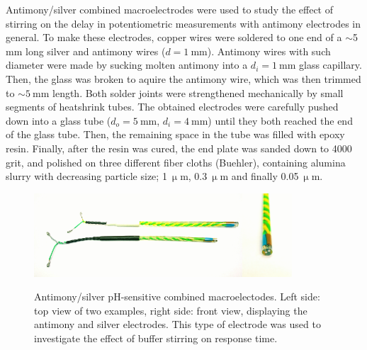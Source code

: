 Antimony/silver combined macroelectrodes were used to study the effect of stirring on the delay in potentiometric measurements with antimony electrodes in general.
To make these electrodes, copper wires were soldered to one end of a $\sim$5$~$mm long silver and antimony wires ($d = 1~$mm).
Antimony wires with such diameter were made by sucking molten antimony into a $d_i = 1~$mm glass capillary.
Then, the glass was broken to aquire the antimony wire, which was then trimmed to $\sim 5~$mm length.
Both solder joints were strengthened mechanically by small segments of heatshrink tubes.
The obtained electrodes were carefully pushed down into a glass tube ($d_o = 5~$mm, $d_i=4~$mm) until they both reached the end of the glass tube.
Then, the remaining space in the tube was filled with epoxy resin.
Finally, after the resin was cured, the end plate was sanded down to 4000 grit, and polished on three different fiber cloths (Buehler), containing alumina slurry with decreasing particle size; 1$~\upmu$m, 0.3$~\upmu$m and finally 0.05$~\upmu$m.

\begin{figure}
\centering
\includegraphics[width=0.693\textwidth]{img/sb_ag_top.jpg}\includegraphics[width=0.165\textwidth]{img/sb_ag_front.jpg}
\caption[Antimony/silver pH-sensitive combined macroelectodes.]{Antimony/silver pH-sensitive combined macroelectodes.
Left side: top view of two examples, right side: front view, displaying the antimony and silver electrodes. This type of electrode was used to investigate the effect of buffer stirring on response time.}
\label{fig:sb_macro}
\end{figure}

